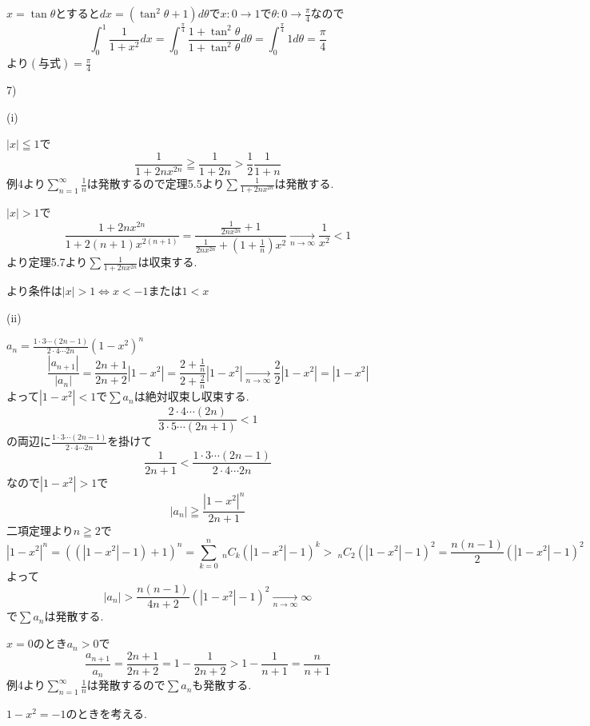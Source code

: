\documentclass{jsarticle}
\begin{document}
$x=\tan \theta$とすると$dx = (\tan^2\theta +1)d\theta$で$x:0\to 1$で$\theta :0\to \frac{\pi}{4}$なので
\[\int_0^1\frac{1}{1+x^2}dx = \int_0^\frac{\pi}{4}\frac{1+\tan^2\theta}{1+\tan^2\theta}d\theta = \int_0^\frac{\pi}{4}1d\theta = \frac{\pi}{4}\]
より$(与式)=\frac{\pi}{4}$

7)

(i)

$|x|\leqq 1$で
\[\frac{1}{1+2nx^{2n}} \geqq \frac{1}{1+2n}>\frac{1}{2} \frac{1}{1+n}\]
例4より$\displaystyle \sum_{n=1}^\infty \frac{1}{n}$は発散するので定理5.5より$\sum \frac{1}{1+2nx^{2n}}$は発散する.

$|x| > 1$で
\[\frac{1+2nx^{2n}}{1+2(n+1)x^{2(n+1)}}=\frac{\frac{1}{2nx^{2n}}+1}{\frac{1}{2nx^{2n}}+(1+\frac{1}{n})x^2}\xrightarrow[n\to\infty]{}\frac{1}{x^2} < 1\]
より定理5.7より$\sum \frac{1}{1+2nx^{2n}}$は収束する.

より条件は$|x|>1 \Leftrightarrow x<-1または1<x$

(ii)

$a_n = \frac{1\cdot 3 \cdots (2n-1)}{2\cdot 4\cdots 2n}(1-x^2)^n$
\[\frac{|a_{n+1}|}{|a_n|}=\frac{2n+1}{2n+2}|1-x^2|=\frac{2+\frac{1}{n}}{2+\frac{2}{n}}|1-x^2|\xrightarrow[n\to\infty]{}\frac{2}{2}|1-x^2|=|1-x^2|\]
よって$|1-x^2|< 1$で$\sum a_n$は絶対収束し収束する.
\[\frac{2\cdot 4 \cdots (2n)}{3\cdot 5\cdots (2n+1)} < 1\]の両辺に$\frac{1\cdot 3 \cdots (2n-1)}{2\cdot 4\cdots 2n}$を掛けて
\[\frac{1}{2n+1} < \frac{1\cdot 3 \cdots (2n-1)}{2\cdot 4\cdots 2n}\]
なので$|1-x^2|>1$で
\[|a_n|\geqq \frac{|1-x^2|^n}{2n+1}\]
二項定理より$n\geqq 2$で
\[|1-x^2|^n = ((|1-x^2|-1)+1)^n = \sum_{k=0}^n \ _nC_k (|1-x^2|-1)^k > 
\ _nC_2 (|1-x^2|-1)^2 = \frac{n(n-1)}{2}(|1-x^2|-1)^2
\]
よって
\[|a_n| > \frac{n(n-1)}{4n+2}(|1-x^2|-1)^2 \xrightarrow[n\to\infty]{} \infty\]
で$\sum a_n$は発散する.

$x=0$のとき$a_n>0$で
\[\frac{a_{n+1}}{a_n}=\frac{2n+1}{2n+2}=1-\frac{1}{2n+2}>1-\frac{1}{n+1}=\frac{n}{n+1}\]
例4より$\displaystyle \sum_{n=1}^\infty \frac{1}{n}$は発散するので$\sum a_n$も発散する.

$1-x^2 = -1$のときを考える.
\end{document}
